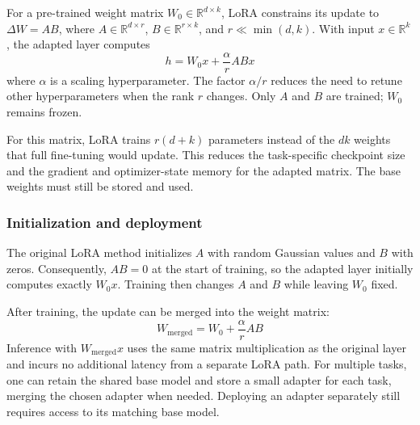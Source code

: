 For a pre-trained weight matrix \(W_0\in\mathbb{R}^{d\times k}\), LoRA constrains its update to \(\Delta W=AB\), where \(A\in\mathbb{R}^{d\times r}\), \(B\in\mathbb{R}^{r\times k}\), and \(r\ll\min(d,k)\). With input \(x\in\mathbb{R}^{k}\), the adapted layer computes
\[
	h=W_0x+\frac{\alpha}{r}ABx
\]
where \(\alpha\) is a scaling hyperparameter.
The factor \(\alpha/r\) reduces the need to retune other hyperparameters when the rank \(r\) changes.
Only \(A\) and \(B\) are trained; \(W_0\) remains frozen.

For this matrix, LoRA trains \(r(d+k)\) parameters instead of the \(dk\) weights that full fine-tuning would update. This reduces the task-specific checkpoint size and the gradient and optimizer-state memory for the adapted matrix. The base weights must still be stored and used.

\subsubsection{Initialization and deployment}

The original LoRA method initializes \(A\) with random Gaussian values and \(B\) with zeros. Consequently, \(AB=0\) at the start of training, so the adapted layer initially computes exactly \(W_0x\). Training then changes \(A\) and \(B\) while leaving \(W_0\) fixed.

After training, the update can be merged into the weight matrix:
\[
	W_{\mathrm{merged}}=W_0+\frac{\alpha}{r}AB
\]
Inference with \(W_{\mathrm{merged}}x\) uses the same matrix multiplication as the original layer and incurs no additional latency from a separate LoRA path. For multiple tasks, one can retain the shared base model and store a small adapter for each task, merging the chosen adapter when needed. Deploying an adapter separately still requires access to its matching base model.
